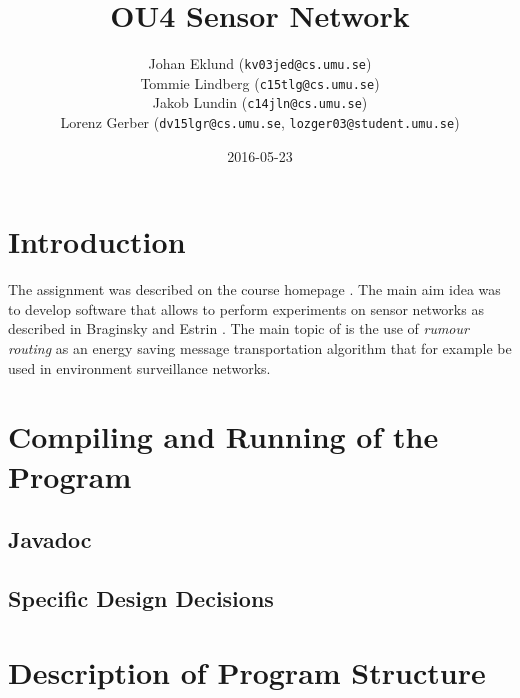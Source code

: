 \documentclass[a4paper,11pt,twoside]{article}
\title{OU4 Sensor Network}
\author{Johan Eklund ({\tt{kv03jed@cs.umu.se}}) \\ 
Tommie Lindberg ({\tt{c15tlg@cs.umu.se}}) \\
Jakob Lundin ({\tt{c14jln@cs.umu.se}}) \\
Lorenz Gerber ({\tt{dv15lgr@cs.umu.se}}, {\tt{lozger03@student.umu.se}})
}
\date{2016-05-23}
\begin{document}
\lstset{language=C}
\maketitle
\thispagestyle{empty}
\newpage
\tableofcontents
\thispagestyle{empty}
\newpage

\clearpage
{}

\section{Introduction} 
The assignment was described on the course homepage
\cite{sensornetwork}. The main aim idea was to develop software that
allows to perform experiments on sensor networks as described in
Braginsky and Estrin \cite{braginsky2002}. The main topic of
\cite{braginsky2002} is the use of \textit{rumour routing} as an
energy saving message transportation algorithm that for example
be used in environment surveillance networks.

\section{Compiling and Running of the Program}

\subsection{Javadoc}

\subsection{Specific Design Decisions}

\section{Description of Program Structure}
\end{document}
